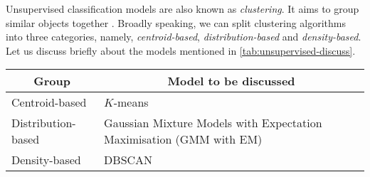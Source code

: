 Unsupervised classification models are also known as \textit{clustering}. It aims to group similar objects together \cite{mur-book}. Broadly speaking, we can split clustering algorithms into three categories, namely, \textit{centroid-based}, \textit{distribution-based} and \textit{density-based}. Let us discuss briefly about the models mentioned in \autoref{tab:unsupervised-discuss}.

\parbox{\linewidth}{
  \centering
  \begin{tabularx}{0.8\textwidth}{|l|X|}
    \hline
    \multicolumn{1}{|c|}{\textbf{Group}} & \multicolumn{1}{c|}{\textbf{Model to be discussed}}
    \\\hline
    Centroid-based & $K$-means 
    \\\hline
    Distribution-based & Gaussian Mixture Models with Expectation Maximisation (GMM with EM)
    \\\hline
    Density-based & DBSCAN
    \\\hline
  \end{tabularx}

  \label{tab:unsupervised-discuss}
}

